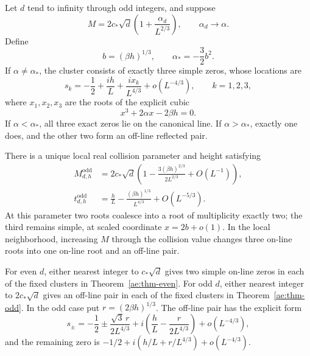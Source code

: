 \begin{theorem}\label{ae:thm-odd}
Let $d$ tend to infinity through odd integers, and suppose
\[
 M=2c_*\sqrt d\left(1+\frac{\alpha_d}{L^{2/3}}\right),
 \qquad \alpha_d\longrightarrow\alpha.
\]
Define
\begin{equation}\label{ae:alpha-star}
 b=(\beta h)^{1/3},\qquad \alpha_*=-\frac32 b^2.
\end{equation}
If $\alpha\ne\alpha_*$, the cluster consists of exactly three simple
zeros, whose locations are
\begin{equation}\label{ae:odd-roots}
 s_k=-\frac12+\frac{ih}{L}+
             \frac{i x_k}{L^{4/3}}+o(L^{-4/3}),\qquad k=1,2,3,
\end{equation}
where $x_1,x_2,x_3$ are the roots of the explicit cubic
\begin{equation}\label{ae:cubic}
 x^3+2\alpha x-2\beta h=0.
\end{equation}
If $\alpha<\alpha_*$, all three exact zeros lie on the canonical line.
If $\alpha>\alpha_*$, exactly one does, and the other two form an off-line
reflected pair.

There is a unique local real collision parameter and height satisfying
\begin{align}
 M^{\mathrm{odd}}_{d,h}
 &=2c_*\sqrt d\left(1-
       \frac{3(\beta h)^{2/3}}{2L^{2/3}}+O(L^{-1})\right),
 \label{ae:odd-critical}\\
 t^{\mathrm{odd}}_{d,h}
 &=\frac hL-\frac{(\beta h)^{1/3}}{L^{4/3}}+O(L^{-5/3}).
 \label{ae:odd-height}
\end{align}
At this parameter two roots coalesce into a root of multiplicity exactly
two; the third remains simple, at scaled coordinate $x=2b+o(1)$.
In the local neighborhood, increasing $M$ through the collision value
changes three on-line roots into one on-line root and an off-line pair.
\end{theorem}

\begin{corollary}
\label{ae:cor-equality}
For even $d$, either nearest integer to $c_*\sqrt d$ gives two simple
on-line zeros in each of the fixed clusters in
Theorem~\ref{ae:thm-even}. For odd $d$, either nearest integer to
$2c_*\sqrt d$ gives an off-line pair in each of the fixed clusters in
Theorem~\ref{ae:thm-odd}. In the odd case put $r=(2\beta h)^{1/3}$.
The off-line pair has the explicit form
\[
 s_\pm=-\frac12\pm\frac{\sqrt3\,r}{2L^{4/3}}
       +i\left(\frac hL-\frac{r}{2L^{4/3}}\right)
       +o(L^{-4/3}),
\]
and the remaining zero is
$-1/2+i(h/L+r/L^{4/3})+o(L^{-4/3})$.
\end{corollary}

